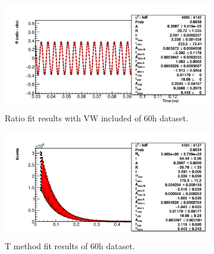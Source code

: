 \documentclass[12pt,letterpaper]{article}
\begin{document}
\begin{figure}[]
\centering
    \begin{subfigure}[]{0.6\textwidth}
        \centering
        \includegraphics[width=\textwidth]{ratioFit_highVWamp}
        \caption{Ratio fit results with VW included of 60h dataset.}
    \label{fig:ratioFit_highVWamp}
    \end{subfigure}%
    \vspace{1cm}
    \begin{subfigure}[]{0.6\textwidth}
        \centering
        \includegraphics[width=\textwidth]{TmethodFit_lowVWamp}
        \caption{T method fit results of 60h dataset.}
    \label{fig:TmethodFit_lowVWamp}
    \end{subfigure}
\caption[]{}
\end{figure}
\end{document}
